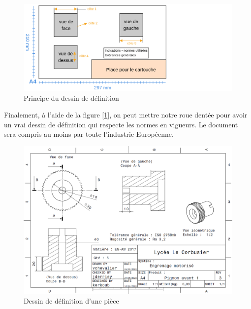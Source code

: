 \documentclass[
	11pt, %
	fleqn, %
	a4paper, %
]{LegrandOrangeBook}
\begin{document}
\begin{figure}[H] %
	\centering %
	\includegraphics[width=1.3\textwidth]{Images/cartouche.png} %
	\caption{Principe du dessin de définition}
	\label{cart} %
\end{figure}

Finalement, à l'aide de la figure [\ref{cart}], on peut mettre notre roue dentée pour avoir un vrai dessin de définition qui respecte les normes en vigueurs. Le document sera compris au moins par toute l'industrie Européenne. 


\begin{figure}[H] %
	\centering %
	\includegraphics[width=1.1\textwidth]{Images/pignon1.PNG} %
	\caption{Dessin de définition d'une pièce}
	\label{pignon1} %
\end{figure}
\end{document}
